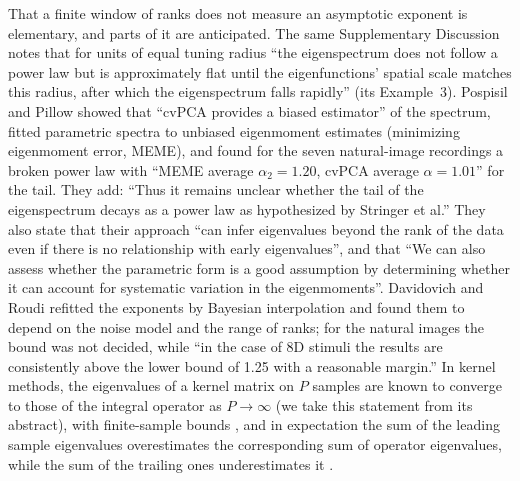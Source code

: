\documentclass[11pt]{article}
\theoremstyle{definition}
\begin{document}
That a finite window of ranks does not measure an asymptotic exponent is elementary, and parts of it are anticipated. The same Supplementary Discussion notes that for units of equal tuning radius ``the eigenspectrum does not follow a power law but is approximately flat until the eigenfunctions' spatial scale matches this radius, after which the eigenspectrum falls rapidly'' (its Example~3). Pospisil and Pillow \cite{pp2025} showed that ``cvPCA provides a biased estimator'' of the spectrum, fitted parametric spectra to unbiased eigenmoment estimates (minimizing eigenmoment error, MEME), and found for the seven natural-image recordings a broken power law with ``MEME average $\alpha_2 = 1.20$, cvPCA average $\alpha = 1.01$'' for the tail. They add: ``Thus it remains unclear whether the tail of the eigenspectrum decays as a power law as hypothesized by Stringer et al.'' They also state that their approach ``can infer eigenvalues beyond the rank of the data even if there is no relationship with early eigenvalues'', and that ``We can also assess whether the parametric form is a good assumption by determining whether it can account for systematic variation in the eigenmoments''. Davidovich and Roudi \cite{dr2022} refitted the exponents by Bayesian interpolation and found them to depend on the noise model and the range of ranks; for the natural images the bound was not decided, while ``in the case of 8D stimuli the results are consistently above the lower bound of 1.25 with a reasonable margin.'' In kernel methods, the eigenvalues of a kernel matrix on $P$ samples are known to converge to those of the integral operator as $P \to \infty$ \cite{kg2000} (we take this statement from its abstract), with finite-sample bounds \cite{braun2006}, and in expectation the sum of the leading sample eigenvalues overestimates the corresponding sum of operator eigenvalues, while the sum of the trailing ones underestimates it \cite{stwck2005}.
\end{document}
